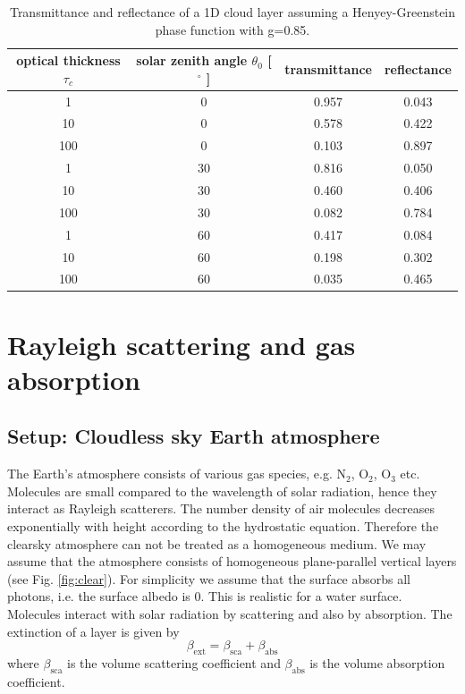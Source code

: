 \documentclass[12pt,twoside,a4paper]{article}
\begin{document}
\begin{table}
  \centering
  \begin{tabular}{c c c c}
    \hline
    optical thickness $\tau_c$ & solar zenith angle $\theta_0$ [ $^\circ$ ] & transmittance &
    reflectance \\ \hline
    1    &  0 & 0.957 & 0.043 \\
    10   &  0 & 0.578 & 0.422 \\ 
    100   &  0 & 0.103 & 0.897 \\
    1  & 30 & 0.816 & 0.050 \\
    10 & 30 & 0.460 & 0.406 \\
    100 & 30 & 0.082 & 0.784 \\
    1 & 60 & 0.417 & 0.084 \\
    10 & 60 & 0.198 & 0.302 \\
    100 & 60 & 0.035 &  0.465 \\ \hline
  \end{tabular}
  \caption{Transmittance and reflectance of a 1D cloud layer assuming
    a Henyey-Greenstein phase function with g=0.85.}
  \label{tab:cloudonly_result}
\end{table}


\cleardoublepage
\section{Rayleigh scattering and gas absorption}
\label{sec:molecules}

\subsection{Setup: Cloudless sky Earth atmosphere}

The Earth's atmosphere consists of various gas species, e.g. N$_2$,
O$_2$, O$_3$ etc. Molecules are small compared to the wavelength of
solar radiation, hence they interact as Rayleigh scatterers.  
The number density of air molecules decreases exponentially with
height according to the hydrostatic equation. Therefore the clearsky
atmosphere can not be treated as a homogeneous medium. 
We may assume that the atmosphere consists of homogeneous
plane-parallel vertical layers (see Fig. \ref{fig:clear}).
For simplicity we assume that the surface absorbs all photons,
i.e. the surface albedo is 0. This is realistic for a water surface. 
Molecules interact with solar radiation by scattering and also by 
absorption. The extinction of a layer is given by
\begin{equation}
  \beta_\mathrm{ext}=\beta_\mathrm{sca}+\beta_\mathrm{abs}
\end{equation}
where $\beta_\mathrm{sca}$ is the volume scattering coefficient and
$\beta_\mathrm{abs}$ is the volume absorption coefficient. 
\end{document}
